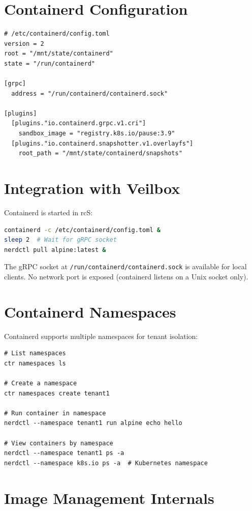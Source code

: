 \section{Containerd Configuration}

\begin{lstlisting}
# /etc/containerd/config.toml
version = 2
root = "/mnt/state/containerd"
state = "/run/containerd"

[grpc]
  address = "/run/containerd/containerd.sock"

[plugins]
  [plugins."io.containerd.grpc.v1.cri"]
    sandbox_image = "registry.k8s.io/pause:3.9"
  [plugins."io.containerd.snapshotter.v1.overlayfs"]
    root_path = "/mnt/state/containerd/snapshots"
\end{lstlisting}

\section{Integration with Veilbox}

Containerd is started in rcS:

\begin{lstlisting}[language=bash]
containerd -c /etc/containerd/config.toml &
sleep 2  # Wait for gRPC socket
nerdctl pull alpine:latest &
\end{lstlisting}

The gRPC socket at \texttt{/run/containerd/containerd.sock} is available
for local clients. No network port is exposed (containerd listens on a
Unix socket only).

\section{Containerd Namespaces}

Containerd supports multiple namespaces for tenant isolation:

\begin{lstlisting}
# List namespaces
ctr namespaces ls

# Create a namespace
ctr namespaces create tenant1

# Run container in namespace
nerdctl --namespace tenant1 run alpine echo hello

# View containers by namespace
nerdctl --namespace tenant1 ps -a
nerdctl --namespace k8s.io ps -a  # Kubernetes namespace
\end{lstlisting}

\section{Image Management Internals}

